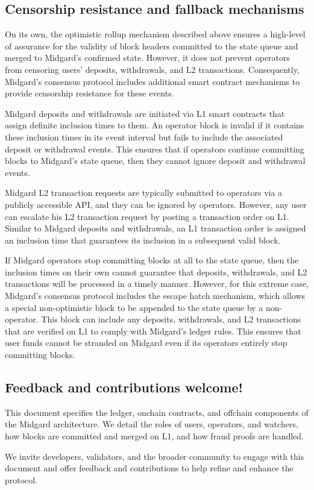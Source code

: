 \documentclass[../midgard.tex]{subfiles}
\begin{document}
\subsection*{Censorship resistance and fallback mechanisms}

On its own, the optimistic rollup mechanism described above ensures a high-level of assurance for the validity of block headers committed to the state queue and merged to Midgard's confirmed state.
However, it does not prevent operators from censoring users' deposits, withdrawals, and L2 transactions.
Consequently, Midgard's consensus protocol includes additional smart contract mechanisms to provide censorship resistance for these events.

Midgard deposits and withdrawals are initiated via L1 smart contracts that assign definite inclusion times to them.
An operator block is invalid if it contains these inclusion times in its event interval but fails to include the associated deposit or withdrawal events.
This ensures that if operators continue committing blocks to Midgard's state queue, then they cannot ignore deposit and withdrawal events.

Midgard L2 transaction requests are typically submitted to operators via a publicly accessible API, and they can be ignored by operators.
However, any user can escalate his L2 transaction request by posting a transaction order on L1.
Similar to Midgard deposits and withdrawals, an L1 transaction order is assigned an inclusion time that guarantees its inclusion in a subsequent valid block.

If Midgard operators stop committing blocks at all to the state queue, then the inclusion times on their own cannot guarantee that deposits, withdrawals, and L2 transactions will be processed in a timely manner.
However, for this extreme case, Midgard's consensus protocol includes the escape hatch mechanism, which allows a special non-optimistic block to be appended to the state queue by a non-operator.
This block can include any deposits, withdrawals, and L2 transactions that are verified on L1 to comply with Midgard's ledger rules.
This ensures that user funds cannot be stranded on Midgard even if its operators entirely stop committing blocks.

\subsection*{Feedback and contributions welcome!}
\label{h:feedback-and-contributions-welcome}

This document specifies the ledger, onchain contracts, and offchain components of the Midgard architecture.
We detail the roles of users, operators, and watchers, how blocks are committed and merged on L1, and how fraud proofs are handled.

We invite developers, validators, and the broader community to engage with this document and offer feedback and contributions to help refine and enhance the protocol.
\end{document}
